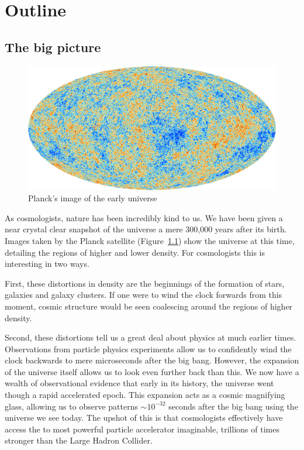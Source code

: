 \chapter{Outline}
\label{chap:out}

\section{The big picture}
\begin{figure}[tp]
  \includegraphics[width=\textwidth]{chapters/outline/figures/planck}
  \caption{Planck's image of the early universe}\label{fig:out:planck}
\end{figure}

As cosmologists, nature has been incredibly kind to us. We have been given a near crystal clear snapshot of the universe a mere 300,000 years after its birth. Images taken by the Planck satellite (Figure~\ref{fig:out:planck}) show the universe at this time, detailing the regions of higher and lower density. For cosmologists this is interesting in two ways. 

First, these distortions in density are the beginnings of the formation of stars, galaxies and galaxy clusters. If one were to wind the clock forwards from this moment, cosmic structure would be seen coalescing around the regions of higher density.

Second, these distortions tell us a great deal about physics at much earlier times. Observations from particle physics experiments allow us to confidently wind the clock backwards to mere microseconds after the big bang.
However, the expansion of the universe itself allows us to look even further back than this. We now have a wealth of observational evidence that early in its history, the universe went though a rapid accelerated epoch.  This expansion acts as a cosmic magnifying glass, allowing us to observe patterns $\sim10^{-32}$ seconds after the big bang using the universe we see today. The upshot of this is that cosmologists effectively have access the to most powerful particle accelerator imaginable, trillions of times stronger than the Large Hadron Collider. 

